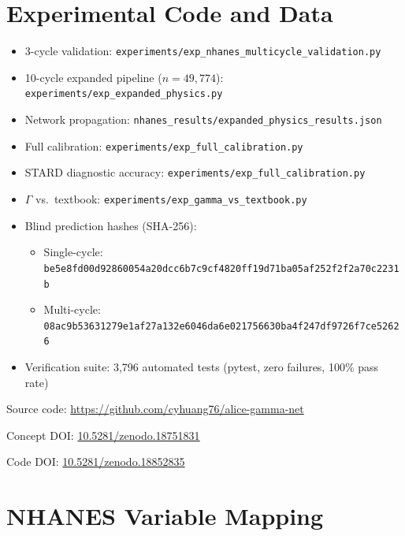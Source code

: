 \documentclass[aps,pre,twocolumn,superscriptaddress,floatfix]{revtex4-2}
\begin{document}
\appendix

\section{Experimental Code and Data}
\label{app:code}

\begin{itemize}
  \item 3-cycle validation:
    \texttt{experiments/exp\_nhanes\_multicycle\_validation.py}
  \item 10-cycle expanded pipeline ($n = 49{,}774$):
    \texttt{experiments/exp\_expanded\_physics.py}
  \item Network propagation:
    \texttt{nhanes\_results/expanded\_physics\_results.json}
  \item Full calibration:
    \texttt{experiments/exp\_full\_calibration.py}
  \item STARD diagnostic accuracy:
    \texttt{experiments/exp\_full\_calibration.py}
  \item $\Gamma$ vs.\ textbook:
    \texttt{experiments/exp\_gamma\_vs\_textbook.py}
  \item Blind prediction hashes (SHA-256):
    \begin{itemize}
      \item Single-cycle:
        \texttt{be5e8fd00d92860054a20dcc6b7c9cf4820ff19d71ba05af252f2f2a70c2231b}
      \item Multi-cycle:
        \texttt{08ac9b53631279e1af27a132e6046da6e021756630ba4f247df9726f7ce52626}
    \end{itemize}
  \item Verification suite: 3{,}796 automated tests (pytest,
    zero failures, 100\% pass rate)
\end{itemize}

Source code: \url{https://github.com/cyhuang76/alice-gamma-net}

Concept DOI:
\href{https://doi.org/10.5281/zenodo.18751831}{10.5281/zenodo.18751831}

Code DOI:
\href{https://doi.org/10.5281/zenodo.18852835}{10.5281/zenodo.18852835}

\section{NHANES Variable Mapping}
\label{app:mapping}
\end{document}
